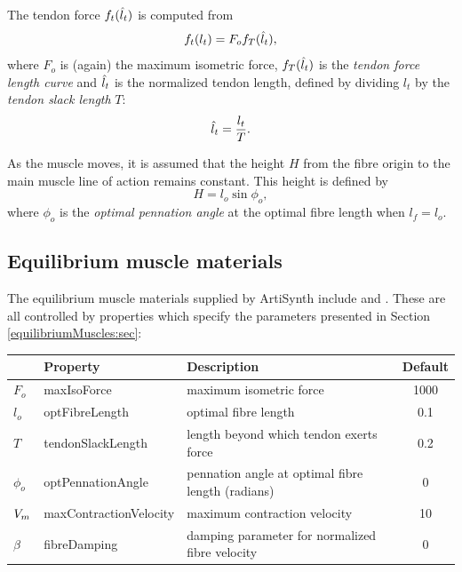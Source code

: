 The tendon force $f_t(\hat{l}_t)$ is computed from 
%
\begin{equation*}
f_t(l_t) = F_o f_T (\hat{l}_t),
\end{equation*}
%
where $F_o$ is (again) the maximum isometric force, $f_T(\hat{l}_t)$ is the
{\it tendon force length curve} and $\hat{l}_t$ is the normalized tendon
length, defined by dividing $l_t$ by the {\it tendon slack length}
$T$:
%
\begin{equation*}
\hat{l}_t = \frac{l_t}{T}.
\end{equation*}
%

As the muscle moves, it is assumed that the height $H$ from the fibre
origin to the main muscle line of action remains constant.
This height is defined by
%
\begin{equation*}
H = l_o \sin \phi_o,
\end{equation*}
%
where $\phi_o$ is the {\it optimal pennation angle} at the optimal
fibre length when $l_f = l_o$.

\subsection{Equilibrium muscle materials}
\label{EquilibriumMuscleMaterials:sec}

The equilibrium muscle materials supplied by ArtiSynth include
 and
.  These
are all controlled by properties which specify the parameters
presented in Section \ref{equilibriumMuscles:sec}:

\begin{center}
\begin{tabular}{|l|l|l|c|} 
\hline
& Property & Description & Default\\
\hline
$F_{o}$ & {\sf maxIsoForce} & 
maximum isometric force & 1000 \\
$l_o$ & {\sf optFibreLength} & 
optimal fibre length & 0.1 \\
$T$ & {\sf tendonSlackLength} & 
length beyond which tendon exerts force & 0.2 \\
$\phi_o$ & {\sf optPennationAngle} & 
pennation angle at optimal fibre length (radians) & 0 \\
$V_{m}$ & {\sf maxContractionVelocity} & 
maximum contraction velocity & 10 \\
$\beta$ & {\sf fibreDamping} & 
damping parameter for normalized fibre velocity & 0 \\
\hline
\end{tabular}
\end{center}

